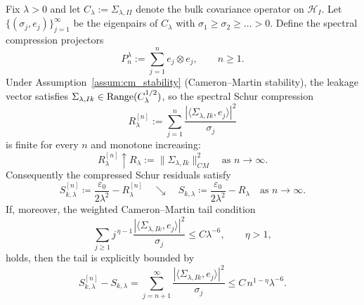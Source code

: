 \begin{lemma}
\label{lem:spectral_schur_support}
Fix $\lambda>0$ and let $C_\lambda:=\Sigma_{\lambda,II}$ denote the bulk covariance operator on $\mathcal{H}_I$.  Let $\{(\sigma_j,e_j)\}_{j=1}^\infty$ be the eigenpairs of $C_\lambda$ with $\sigma_1\ge\sigma_2\ge\dots>0$.  Define the spectral compression projectors
\begin{equation}
  P_n^\lambda:=\sum_{j=1}^{n}e_j\otimes e_j,\qquad n\ge1.
\end{equation}
Under Assumption~\ref{assum:cm_stability} (Cameron--Martin stability), the leakage vector satisfies $\Sigma_{\lambda,Ik}\in\operatorname{Range}(C_\lambda^{1/2})$, so the spectral Schur compression
\begin{equation}
  R_\lambda^{[n]}:=\sum_{j=1}^{n}\frac{|\langle\Sigma_{\lambda,Ik},e_j\rangle|^2}{\sigma_j}
\end{equation}
is finite for every $n$ and monotone increasing:
\begin{equation}
  R_\lambda^{[n]}\uparrow R_\lambda:=\|\Sigma_{\lambda,Ik}\|_{CM}^2\quad\text{as }n\to\infty.
\end{equation}
Consequently the compressed Schur residuals satisfy
\begin{equation}
  S_{k,\lambda}^{[n]}\coloneqq\frac{\varepsilon_0}{2\lambda^2}-R_\lambda^{[n]}
  \quad\searrow\quad
  S_{k,\lambda}\coloneqq\frac{\varepsilon_0}{2\lambda^2}-R_\lambda
  \quad\text{as }n\to\infty.
\end{equation}
If, moreover, the weighted Cameron--Martin tail condition
\begin{equation}
  \sum_{j\ge1}j^{\,\eta-1}\frac{|\langle\Sigma_{\lambda,Ik},e_j\rangle|^2}{\sigma_j}
  \le C\lambda^{-6},\qquad\eta>1,
\end{equation}
holds, then the tail is explicitly bounded by
\begin{equation}
  S_{k,\lambda}^{[n]}-S_{k,\lambda}
  =\sum_{j=n+1}^{\infty}\frac{|\langle\Sigma_{\lambda,Ik},e_j\rangle|^2}{\sigma_j}
  \le C\,n^{1-\eta}\lambda^{-6}.
\end{equation}
\end{lemma}
